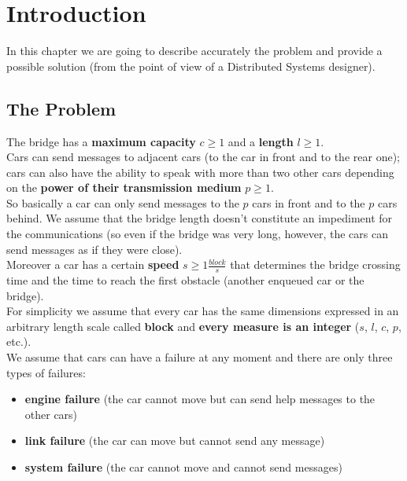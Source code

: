 \chapter{Introduction}\label{ch:intro}

In this chapter we are going to describe accurately the problem and provide a possible 
solution (from the point of view of a Distributed Systems designer).\\


\section{The Problem}

The bridge has a \textbf{maximum capacity} $c \geq 1$ and a \textbf{length} $l \geq 1$. \\

Cars can send messages to adjacent cars (to the car in front and to the rear one); 
cars can also have the ability to speak with more than two other cars depending on the 
\textbf{power of their transmission medium} $p \geq 1$.\\

So basically a car can only send messages to the $p$ cars in front and 
to the $p$ cars behind. We assume that the bridge length doesn't constitute an impediment 
for the communications (so even if the bridge was very long, however, 
the cars can send messages as if they were close).\\

Moreover a car has a certain \textbf{speed} $s \geq 1 \frac{block}{s}$ that determines 
the bridge crossing time and the time to reach the first obstacle 
(another enqueued car or the bridge).\\ 

For simplicity we assume that every car has the 
same dimensions expressed in an arbitrary length scale called \textbf{block} and 
\textbf{every measure is an integer} ($s$, $l$, $c$, $p$, etc.). \\

We assume that cars can have a failure at any moment and there are only 
three types of failures:
\begin{itemize}
    \item \textbf{engine failure} (the car cannot move but can send help messages to the other cars)
    \item \textbf{link failure} (the car can move but cannot send any message)
    \item \textbf{system failure} (the car cannot move and cannot send messages)
\end{itemize}

